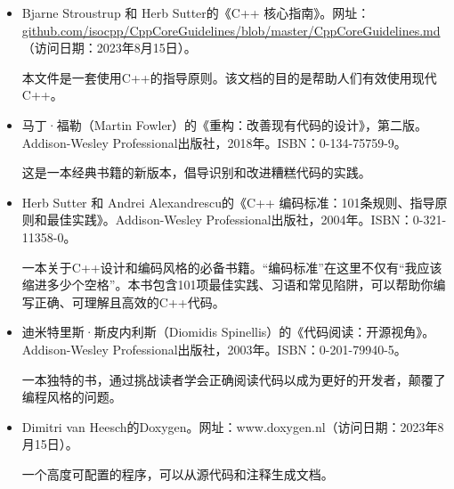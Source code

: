 
\begin{itemize}
\item
Bjarne Stroustrup 和 Herb Sutter的《C++ 核心指南》。网址：\url{github.com/isocpp/CppCoreGuidelines/blob/master/CppCoreGuidelines.md}（访问日期：2023年8月15日）。

\hspace*{\fill}

本文件是一套使用C++的指导原则。该文档的目的是帮助人们有效使用现代C++。

\hspace*{\fill}

\item
马丁·福勒（Martin Fowler）的《重构：改善现有代码的设计》，第二版。Addison-Wesley Professional出版社，2018年。ISBN：0-134-75759-9。

\hspace*{\fill}

这是一本经典书籍的新版本，倡导识别和改进糟糕代码的实践。

\hspace*{\fill}

\item
Herb Sutter 和 Andrei Alexandrescu的《C++ 编码标准：101条规则、指导原则和最佳实践》。Addison-Wesley Professional出版社，2004年。ISBN：0-321-11358-0。

\hspace*{\fill}

一本关于C++设计和编码风格的必备书籍。“编码标准”在这里不仅有“我应该缩进多少个空格”。本书包含101项最佳实践、习语和常见陷阱，可以帮助你编写正确、可理解且高效的C++代码。

\hspace*{\fill}

\item
迪米特里斯·斯皮内利斯（Diomidis Spinellis）的《代码阅读：开源视角》。Addison-Wesley Professional出版社，2003年。ISBN：0-201-79940-5。

\hspace*{\fill}

一本独特的书，通过挑战读者学会正确阅读代码以成为更好的开发者，颠覆了编程风格的问题。

\hspace*{\fill}

\item
Dimitri van Heesch的Doxygen。网址：www.doxygen.nl（访问日期：2023年8月15日）。

\hspace*{\fill}

一个高度可配置的程序，可以从源代码和注释生成文档。


\end{itemize}
